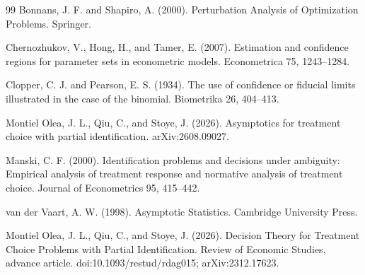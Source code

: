 \documentclass{article}
\begin{document}
\begin{thebibliography}{99}
   Bonnans, J. F. and Shapiro, A. (2000). Perturbation Analysis of Optimization Problems. Springer.

   Chernozhukov, V., Hong, H., and Tamer, E. (2007). Estimation and confidence regions for parameter sets in econometric models. Econometrica 75, 1243--1284.

   Clopper, C. J. and Pearson, E. S. (1934). The use of confidence or fiducial limits illustrated in the case of the binomial. Biometrika 26, 404--413.

   Montiel Olea, J. L., Qiu, C., and Stoye, J. (2026). Asymptotics for treatment choice with partial identification. arXiv:2608.09027.

   Manski, C. F. (2000). Identification problems and decisions under ambiguity: Empirical analysis of treatment response and normative analysis of treatment choice. Journal of Econometrics 95, 415--442.

   van der Vaart, A. W. (1998). Asymptotic Statistics. Cambridge University Press.

   Montiel Olea, J. L., Qiu, C., and Stoye, J. (2026). Decision Theory for Treatment Choice Problems with Partial Identification. Review of Economic Studies, advance article. doi:10.1093/restud/rdag015; arXiv:2312.17623.

\end{thebibliography}
\end{document}
